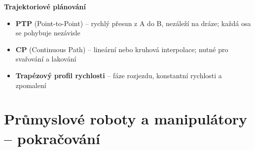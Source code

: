 \documentclass[a4paper,10pt]{article}
\begin{document}
\begin{vysvetlenibox}
\textbf{Trajektoriové plánování}
\begin{itemize}[noitemsep, leftmargin=1.4em, topsep=4pt]
    \item \textbf{PTP} (Point-to-Point) -- rychlý přesun z A do B,
          nezáleží na dráze; každá osa se pohybuje nezávisle
    \item \textbf{CP} (Continuous Path) -- lineární nebo kruhová interpolace;
          nutné pro svařování a lakování
    \item \textbf{Trapézový profil rychlosti} -- fáze rozjezdu,
          konstantní rychlosti a zpomalení
\end{itemize}
\end{vysvetlenibox}

\section{Průmyslové roboty a manipulátory -- pokračování}
\end{document}
